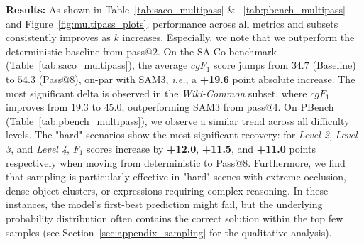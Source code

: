 \noindent \textbf{Results:} As shown in Table~\ref{tab:saco_multipass} \& ~\ref{tab:pbench_multipass} and Figure~\ref{fig:multipass_plots}, performance across all metrics and subsets consistently improves as $k$ increases. Especially, we note that we outperform the deterministic baseline from pass@$2$.
On the SA-Co benchmark (Table~\ref{tab:saco_multipass}), the average $cgF_1$ score jumps from $34.7$ (Baseline) to $54.3$ (Pass@8), on-par with SAM3, \textit{i.e.}, a \textbf{+19.6} point absolute increase. The most significant delta is observed in the \textit{Wiki-Common} subset, where $cgF_1$ improves from $19.3$ to $45.0$, outperforming SAM3 from pass@$4$. 
On PBench (Table~\ref{tab:pbench_multipass}), we observe a similar trend across all difficulty levels. The "hard" scenarios show the most significant recovery: for \textit{Level 2}, \textit{Level 3}, and \textit{Level 4}, $F_1$ scores increase by \textbf{+12.0}, \textbf{+11.5}, and \textbf{+11.0} points respectively when moving from deterministic to Pass@8.
Furthermore, we find that sampling is particularly effective in "hard" scenes with extreme occlusion, dense object clusters, or expressions requiring complex reasoning. In these instances, the model's first-best prediction might fail, but the underlying probability distribution often contains the correct solution within the top few samples (see Section~\ref{sec:appendix_sampling} for the qualitative analysis).


